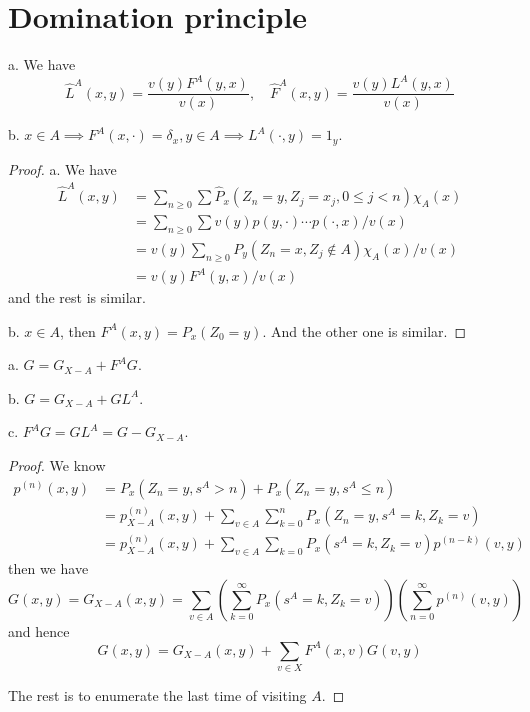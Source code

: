 \documentclass[lang=en,11pt,a4paper,citestyle =authoryear]{elegantpaper}
\begin{document}
\section{Domination principle}

\begin{proposition}
    a. We have
    \[
    \hat{L}^A(x,y) = \dfrac{v(y)F^A(y,x)}{v(x)},\quad \hat{F}^A(x,y) = \dfrac{v(y)L^A(y,x)}{v(x)}
    \]\par
    b. $x\in A \implies F^A(x,\cdot) = \delta_x, y\in A \implies L^A(\cdot,y) = 1_y$.
\end{proposition}
\begin{proof}
    a. We have
    \[
    \begin{aligned}
        \hat{L}^A(x,y) &= \sum\limits_{n\geq 0}\sum \hat{P}_x(Z_n = y, Z_j = x_j, 0\leq j < n)\chi_A(x) \\
        &= \sum\limits_{n\geq 0}\sum v(y)p(y,\cdot)\cdots p(\cdot,x)/v(x) \\
        &= v(y)\sum\limits_{n\geq 0}P_y(Z_n=x,Z_j\notin A)\chi_A(x)/v(x) \\
        &= v(y)F^A(y,x)/v(x)
    \end{aligned} 
    \]
    and the rest is similar.\par
    b. $x\in A$, then $F^A(x,y) = P_x(Z_0 = y)$. And the other one is similar.
\end{proof}

\begin{lemma}
    a. $G = G_{X-A}+F^AG$.\par
    b. $G = G_{X-A} + GL^A$.\par
    c. $F^AG = GL^A  = G-G_{X-A}$.
\end{lemma}
\begin{proof}
    We know
    \[
    \begin{aligned}
    p^{(n)}(x,y) &= P_x(Z_n = y, s^A>n)+P_x(Z_n = y, s^A \leq n)\\
    &= p_{X-A}^{(n)}(x,y) + \sum_{v\in A}\sum\limits_{k=0}^n P_x(Z_n = y, s^A = k, Z_k = v) \\
    & = p_{X-A}^{(n)}(x,y) + \sum_{v\in A}\sum\limits_{k=0}P_x(s^A = k,Z_k = v)p^{(n-k)}(v,y)
    \end{aligned}
    \]
    then we have
    \[
    G(x,y) = G_{X-A}(x,y) = \sum\limits_{v\in A}(\sum\limits_{k=0}^{\infty}P_x(s^A = k, Z_k = v))(\sum\limits_{n=0}^{\infty} p^{(n)}(v,y))
    \]
    and hence
    \[
    G(x,y) = G_{X-A}(x,y) + \sum\limits_{v\in X}F^A(x,v)G(v,y)
    \]\par 
    The rest is to enumerate the last time of visiting $A$.
\end{proof}
\end{document}
